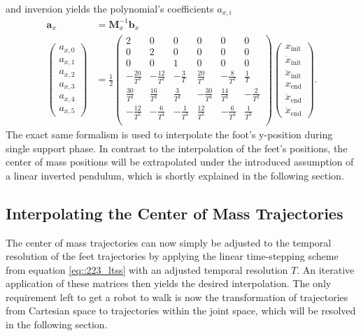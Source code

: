 and inversion yields the polynomial's coefficients $a_{x,i}$
\begin{align}
	\bm{a}_x &= \bm{M}_x^{-1}\bm{b}_x \\
	\begin{pmatrix}
		a_{x,0} \\
		a_{x,1} \\
		a_{x,2} \\
		a_{x,3} \\
		a_{x,4} \\
		a_{x,5}
	\end{pmatrix} &= 
	\frac{1}{2}
	\begin{pmatrix}
		2 & 0 & 0 & 0 & 0 & 0 \\
		0 & 2 & 0 & 0 & 0 & 0 \\
		0 & 0 & 1 & 0 & 0 & 0 \\
		-\frac{20}{T^3} & -\frac{12}{T^2} & -\frac{3}{T} & \frac{20}{T^3} & -\frac{8}{T^2} & \frac{1}{T} \\
		\frac{30}{T^4} & \frac{16}{T^3} & \frac{3}{T^2} & -\frac{30}{T^4} & \frac{14}{T^3} & -\frac{2}{T^2} \\
		-\frac{12}{T^5} & -\frac{6}{T^4} & -\frac{1}{T^3} & \frac{12}{T^5} & -\frac{6}{T^4} & \frac{1}{T^3} \\
	\end{pmatrix}
	\begin{pmatrix}
		x_\text{init} \\
		\dot{x}_\text{init} \\
		\ddot{x}_\text{init} \\
		x_\text{end} \\
		\dot{x}_\text{end} \\
		\ddot{x}_\text{end} 
	\end{pmatrix}.
	\label{eq::231_ai_5th}
\end{align}
The exact same formalism is used to interpolate the foot's y-position during single support phase. In contrast to the interpolation of the feet's positions, the center of mass positions will be extrapolated under the introduced assumption of a linear inverted pendulum, which is shortly explained in the following section.

\FloatBarrier
\subsection{Interpolating the Center of Mass Trajectories}
\label{sec::232_ip}
The center of mass trajectories can now simply be adjusted to the temporal resolution of the feet trajectories by applying the linear time-stepping scheme from equation \ref{eq::223_ltss} with an adjusted temporal resolution $T$. An iterative application of these matrices then yields the desired interpolation. The only requirement left to get a robot to walk is now the transformation of trajectories from Cartesian space to trajectories within the joint space, which will be resolved in the following section.